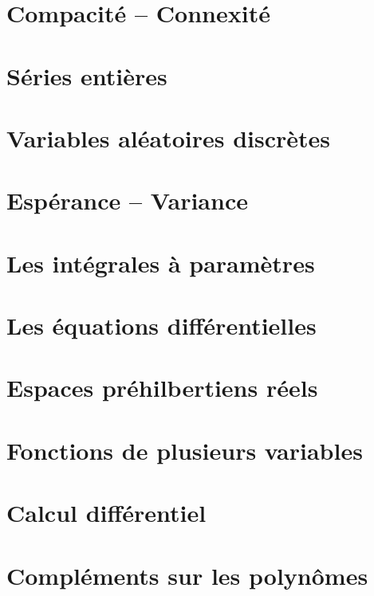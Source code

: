 \documentclass{report}
\begin{document}
\chapter{Compacité -- Connexité}

\chapter{Séries entières}

\chapter{Variables aléatoires discrètes}

\chapter{Espérance -- Variance}

\chapter{Les intégrales à paramètres}

\chapter{Les équations différentielles}

\chapter{Espaces préhilbertiens réels}

\chapter{Fonctions de plusieurs variables}

\chapter{Calcul différentiel}



\chapter{Compléments sur les polynômes}



\printindex
\end{document}
